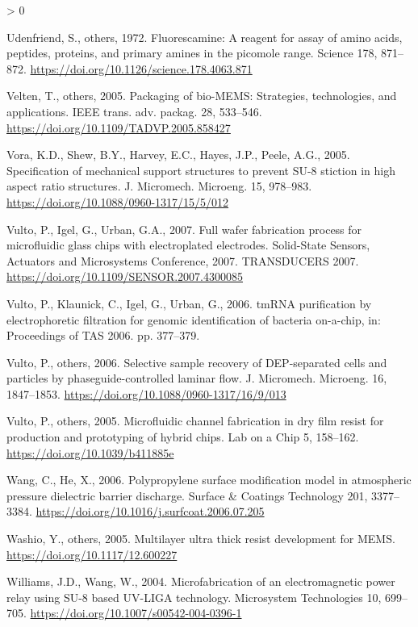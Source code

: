 \documentclass[
  11pt,
  twoside]{article}
\newlength{\cslhangindent}
\newenvironment{CSLReferences}[2] %
 {%
  \setlength{\parindent}{0pt}
  \ifodd #1 \everypar{\setlength{\hangindent}{\cslhangindent}}\ignorespaces\fi
  \ifnum #2 > 0
  \setlength{\parskip}{#2\baselineskip}
  \fi
 }%
 {}
\begin{document}
\begin{CSLReferences}{1}{0}
\leavevmode\hypertarget{ref-Uden1972}{}%
Udenfriend, S., others, 1972. Fluorescamine: A reagent for assay of amino acids, peptides, proteins, and primary amines in the picomole range. Science 178, 871--872. \url{https://doi.org/10.1126/science.178.4063.871}

\leavevmode\hypertarget{ref-Velt05}{}%
Velten, T., others, 2005. Packaging of bio-MEMS: Strategies, technologies, and applications. IEEE trans. adv. packag. 28, 533--546. \url{https://doi.org/10.1109/TADVP.2005.858427}

\leavevmode\hypertarget{ref-Vora05}{}%
Vora, K.D., Shew, B.Y., Harvey, E.C., Hayes, J.P., Peele, A.G., 2005. {Specification of mechanical support structures to prevent SU-8 stiction in high aspect ratio structures}. J. Micromech. Microeng. 15, 978--983. \url{https://doi.org/10.1088/0960-1317/15/5/012}

\leavevmode\hypertarget{ref-Vult07}{}%
Vulto, P., Igel, G., Urban, G.A., 2007. Full wafer fabrication process for microfluidic glass chips with electroplated electrodes. Solid-State Sensors, Actuators and Microsystems Conference, 2007. TRANSDUCERS 2007. \url{https://doi.org/10.1109/SENSOR.2007.4300085}

\leavevmode\hypertarget{ref-Vult06-2}{}%
Vulto, P., Klaunick, C., Igel, G., Urban, G., 2006. {tmRNA} purification by electrophoretic filtration for genomic identification of bacteria on-a-chip, in: Proceedings of {}TAS 2006. pp. 377--379.

\leavevmode\hypertarget{ref-Vult06}{}%
Vulto, P., others, 2006. Selective sample recovery of DEP-separated cells and particles by phaseguide-controlled laminar flow. J. Micromech. Microeng. 16, 1847--1853. \url{https://doi.org/10.1088/0960-1317/16/9/013}

\leavevmode\hypertarget{ref-Vult05}{}%
Vulto, P., others, 2005. Microfluidic channel fabrication in dry film resist for production and prototyping of hybrid chips. Lab on a Chip 5, 158--162. \url{https://doi.org/10.1039/b411885e}

\leavevmode\hypertarget{ref-Wang06}{}%
Wang, C., He, X., 2006. Polypropylene surface modification model in atmospheric pressure dielectric barrier discharge. Surface \& Coatings Technology 201, 3377--3384. \url{https://doi.org/10.1016/j.surfcoat.2006.07.205}

\leavevmode\hypertarget{ref-Wash05}{}%
Washio, Y., others, 2005. Multilayer ultra thick resist development for {MEMS}. \url{https://doi.org/10.1117/12.600227}

\leavevmode\hypertarget{ref-Will04}{}%
Williams, J.D., Wang, W., 2004. Microfabrication of an electromagnetic power relay using {SU-8 based UV-LIGA} technology. Microsystem Technologies 10, 699--705. \url{https://doi.org/10.1007/s00542-004-0396-1}


\end{CSLReferences}
\end{document}
